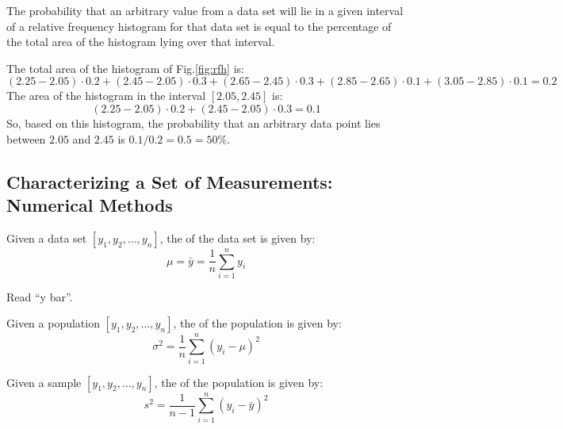 \begin{note}
    The probability that an arbitrary value from a data set will lie in a given interval of a relative frequency histogram for that data set is equal to the percentage of the total area of the histogram lying over that interval.
\end{note}

\begin{exmp}
    The total area of the histogram of Fig.\ref{fig:rfh} is: $$(2.25 - 2.05)\cdot 0.2 + (2.45 - 2.05)\cdot 0.3 + (2.65 - 2.45)\cdot 0.3 + (2.85 - 2.65)\cdot 0.1 + (3.05 - 2.85)\cdot 0.1 = 0.2$$
    The area of the histogram in the interval $[2.05, 2.45]$ is: $$(2.25 - 2.05)\cdot 0.2 + (2.45 - 2.05)\cdot 0.3 = 0.1$$
    So, based on this histogram, the probability that an arbitrary data point lies between $2.05$ and $2.45$ is $0.1 / 0.2 = 0.5 = 50\%$.
\end{exmp}

\subsection{Characterizing a Set of Measurements: Numerical Methods}

\begin{defn}
    Given a data set $[y_{1}, y_{2}, \ldots, y_{n}]$, the  of the data set is given by: $$\mu = \bar{y} = \frac{1}{n} \sum_{i=1}^{n} y_{i}$$
\end{defn}

\begin{nota}
\end{nota}

\begin{nota}
    Read ``y bar''.
\end{nota}

\begin{defn}
    Given a population $[y_{1}, y_{2}, \ldots, y_{n}]$, the  of the population is given by: $$\sigma^{2} = \frac{1}{n} \sum_{i=1}^{n} (y_{i} - \mu)^{2}$$
\end{defn}

\begin{nota}
\end{nota}

\pagebreak
\begin{defn}
    Given a sample $[y_{1}, y_{2}, \ldots, y_{n}]$, the  of the population is given by: $$s^{2} = \frac{1}{n-1} \sum_{i=1}^{n} (y_{i} - \bar{y})^{2}$$
\end{defn}

